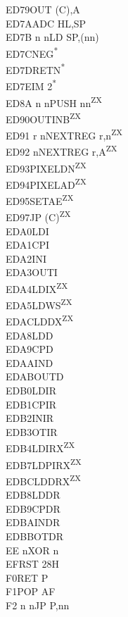 \documentclass[twoside,openright,a4paper]{book}
\begin{document}
\begin{multicols}{3}
{\begin{tabbing}
	ED79\>OUT (C),A\\
	ED7A\>ADC HL,SP\\
	ED7B n n\>LD SP,(nn)\\
	ED7C\>NEG\textsuperscript{*}\\
	ED7D\>RETN\textsuperscript{*}\\
	ED7E\>IM 2\textsuperscript{*}\\
	ED8A n n\>PUSH nn\textsuperscript{ZX}\\
	ED90\>OUTINB\textsuperscript{ZX}\\
	ED91 r n\>NEXTREG r,n\textsuperscript{ZX}\\
	ED92 n\>NEXTREG r,A\textsuperscript{ZX}\\
	ED93\>PIXELDN\textsuperscript{ZX}\\
	ED94\>PIXELAD\textsuperscript{ZX}\\
	ED95\>SETAE\textsuperscript{ZX}\\
	ED97\>JP (C)\textsuperscript{ZX}\\
	EDA0\>LDI\\
	EDA1\>CPI\\
	EDA2\>INI\\
	EDA3\>OUTI\\
	EDA4\>LDIX\textsuperscript{ZX}\\
	EDA5\>LDWS\textsuperscript{ZX}\\
	EDAC\>LDDX\textsuperscript{ZX}\\
	EDA8\>LDD\\
	EDA9\>CPD\\
	EDAA\>IND\\
	EDAB\>OUTD\\
	EDB0\>LDIR\\
	EDB1\>CPIR\\
	EDB2\>INIR\\
	EDB3\>OTIR\\
	EDB4\>LDIRX\textsuperscript{ZX}\\
	EDB7\>LDPIRX\textsuperscript{ZX}\\
	EDBC\>LDDRX\textsuperscript{ZX}\\
	EDB8\>LDDR\\
	EDB9\>CPDR\\
	EDBA\>INDR\\
	EDBB\>OTDR\\
	EE n\>XOR n\\
	EF\>RST 28H\\
	F0\>RET P\\
	F1\>POP AF\\
	F2 n n\>JP P,nn\\

\end{tabbing}}
\end{multicols}
\end{document}
